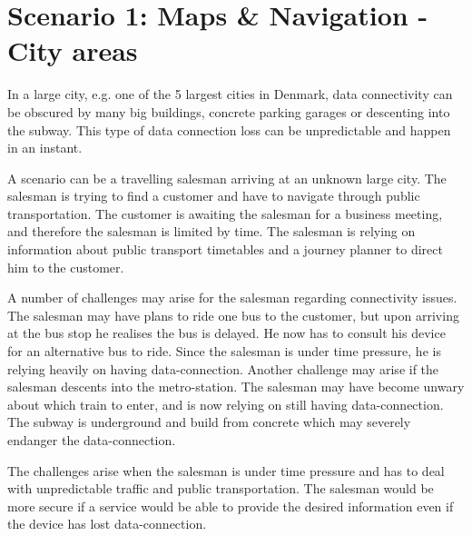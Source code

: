 \section{Scenario 1: Maps \& Navigation - City areas}
In a large city, e.g. one of the 5 largest cities in Denmark, data connectivity can be obscured by many big buildings, concrete parking garages or descenting into the subway. This type of data connection loss can be unpredictable and happen in an instant. 

A scenario can be a travelling salesman arriving at an unknown large city. The salesman is trying to find a customer and have to navigate through public transportation. The customer is awaiting the salesman for a business meeting, and therefore the salesman is limited by time. The salesman is relying on information about public transport timetables and a journey planner to direct him to the customer. 

A number of challenges may arise for the salesman regarding connectivity issues. The salesman may have plans to ride one bus to the customer, but upon arriving at the bus stop he realises the bus is delayed. He now has to consult his device for an alternative bus to ride. Since the salesman is under time pressure, he is relying heavily on having data-connection. Another challenge may arise if the salesman descents into the metro-station. The salesman may have become unwary about which train to enter, and is now relying on still having data-connection. The subway is underground and build from concrete which may severely endanger the data-connection. 

The challenges arise when the salesman is under time pressure and has to deal with unpredictable traffic and public transportation. The salesman would be more secure if a service would be able to provide the desired information even if the device has lost data-connection.